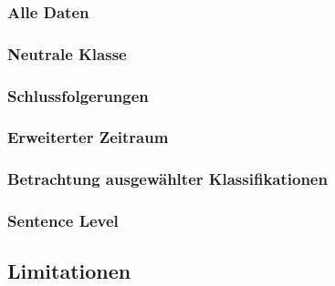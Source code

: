 \subsubsection{Alle Daten}


\subsubsection{Neutrale Klasse}


\subsubsection{Schlussfolgerungen}


\subsubsection{Erweiterter Zeitraum}


\subsubsection{Betrachtung ausgewählter Klassifikationen}


\subsubsection{Sentence Level}


\subsection{Limitationen}

